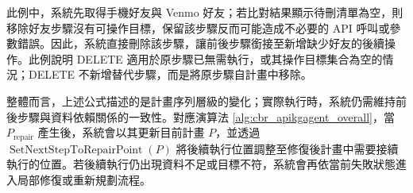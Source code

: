 \begin{ZhChapter}
    此例中，系統先取得手機好友與 Venmo 好友；若比對結果顯示待刪清單為空，則移除好友步驟沒有可操作目標，保留該步驟反而可能造成不必要的 API 呼叫或參數錯誤。因此，系統直接刪除該步驟，讓前後步驟銜接至新增缺少好友的後續操作。此例說明 DELETE 適用於原步驟已無需執行，或其操作目標集合為空的情況；DELETE 不新增替代步驟，而是將原步驟自計畫中移除。

整體而言，上述公式描述的是計畫序列層級的變化；實際執行時，系統仍需維持前後步驟與資料依賴關係的一致性。對應演算法 \ref{alg:cbr_apikgagent_overall}，當 \(P_{\mathrm{repair}}\) 產生後，系統會以其更新目前計畫 \(P\)，並透過 \(\operatorname{SetNextStepToRepairPoint}(P)\) 將後續執行位置調整至修復後計畫中需要接續執行的位置。若後續執行仍出現資料不足或目標不符，系統會再依當前失敗狀態進入局部修復或重新規劃流程。

\end{ZhChapter}
